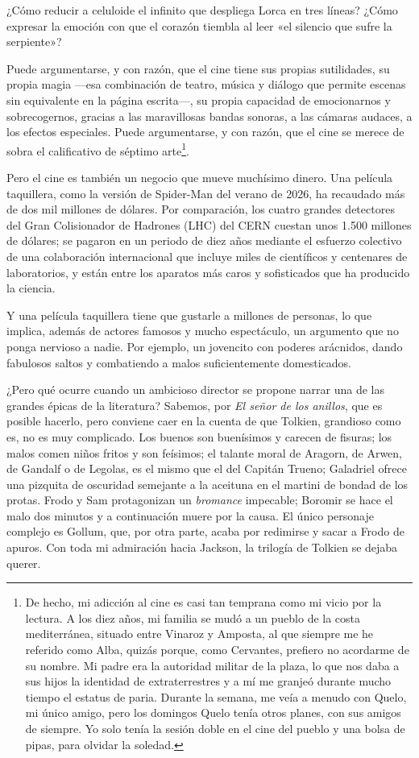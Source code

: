 ¿Cómo reducir a celuloide el infinito que despliega Lorca en tres líneas? ¿Cómo expresar la emoción con que el corazón tiembla al leer «el silencio que sufre la serpiente»?

Puede argumentarse, y con razón, que el cine tiene sus propias sutilidades, su propia magia ---esa combinación de teatro, música y diálogo que permite escenas sin equivalente en la página escrita---, su propia capacidad de emocionarnos y sobrecogernos, gracias a las maravillosas bandas sonoras, a las cámaras audaces, a los efectos especiales. Puede argumentarse, y con razón, que el cine se merece de sobra el calificativo de séptimo arte\footnote{De hecho, mi adicción al cine es casi tan temprana como mi vicio por la lectura. A los diez años, mi familia se mudó a un pueblo de la costa mediterránea, situado entre Vinaroz y Amposta, al que siempre me he referido como Alba, quizás porque, como Cervantes, prefiero no acordarme de su nombre. Mi padre era la autoridad militar de la plaza, lo que nos daba a sus hijos la identidad de extraterrestres y a mí me granjeó durante mucho tiempo el estatus de paria. Durante la semana, me veía a menudo con Quelo, mi único amigo, pero los domingos Quelo tenía otros planes, con sus amigos de siempre. Yo solo tenía la sesión doble en el cine del pueblo y una bolsa de pipas, para olvidar la soledad.}.

Pero el cine es también un negocio que mueve muchísimo dinero. Una película taquillera, como la versión de Spider-Man del verano de 2026, ha recaudado más de dos mil millones de dólares. Por comparación, los cuatro grandes detectores del Gran Colisionador de Hadrones (LHC) del CERN cuestan unos 1.500 millones de dólares; se pagaron en un periodo de diez años mediante el esfuerzo colectivo de una colaboración internacional que incluye miles de científicos y centenares de laboratorios, y están entre los aparatos más caros y sofisticados que ha producido la ciencia.

Y una película taquillera tiene que gustarle a millones de personas, lo que implica, además de actores famosos y mucho espectáculo, un argumento que no ponga nervioso a nadie. Por ejemplo, un jovencito con poderes arácnidos, dando fabulosos saltos y combatiendo a malos suficientemente domesticados.

¿Pero qué ocurre cuando un ambicioso director se propone narrar una de las grandes épicas de la literatura? Sabemos, por \emph{El señor de los anillos}, que es posible hacerlo, pero conviene caer en la cuenta de que Tolkien, grandioso como es, no es muy complicado. Los buenos son buenísimos y carecen de fisuras; los malos comen niños fritos y son feísimos; el talante moral de Aragorn, de Arwen, de Gandalf o de Legolas, es el mismo que el del Capitán Trueno; Galadriel ofrece una pizquita de oscuridad semejante a la aceituna en el martini de bondad de los protas. Frodo y Sam protagonizan un \emph{bromance} impecable; Boromir se hace el malo dos minutos y a continuación muere por la causa. El único personaje complejo es Gollum, que, por otra parte, acaba por redimirse y sacar a Frodo de apuros. Con toda mi admiración hacia Jackson, la trilogía de Tolkien se dejaba querer.

